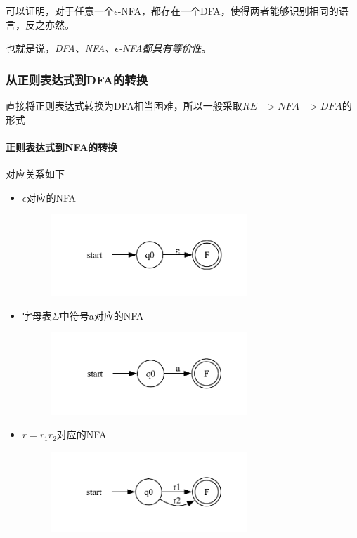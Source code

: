 \documentclass[UTF8]{ctexart} %
\begin{document}
可以证明，对于任意一个$\epsilon$-NFA，都存在一个DFA，使得两者能够识别相同的语言，反之亦然。

也就是说，\emph{DFA、NFA、$\epsilon$-NFA都具有等价性}。

\subsubsection{从正则表达式到DFA的转换}

直接将正则表达式转换为DFA相当困难，所以一般采取$RE->NFA->DFA$的形式

\paragraph{正则表达式到NFA的转换} 对应关系如下

\begin{itemize}
    \item $\epsilon$对应的NFA
          \begin{figure}[H]
              \centering
              \includegraphics[width=0.7\textwidth]{assets/空串NFA.pdf}
          \end{figure}
    \item 字母表$\Sigma$中符号a对应的NFA
          \begin{figure}[H]
              \centering
              \includegraphics[width=0.7\textwidth]{assets/aNFA.pdf}
          \end{figure}
    \item $r=r_1r_2$对应的NFA
          \begin{figure}[H]
              \centering
              \includegraphics[width=0.7\textwidth]{assets/r1orr2NFA.pdf}

\end{figure}
\end{itemize}
\end{document}
